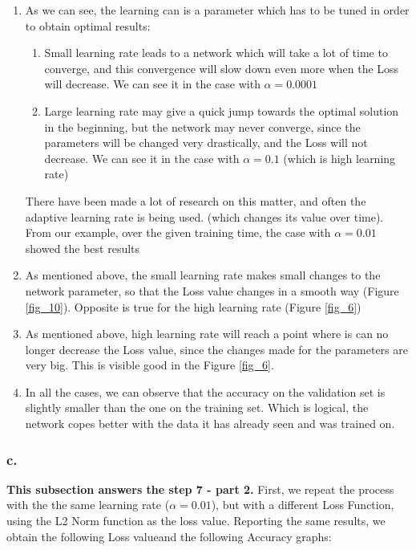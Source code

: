 \documentclass[a4paper]{iacas}
\begin{document}
\begin{enumerate}
\item As we can see, the learning can is a parameter which has to be tuned in order to obtain optimal results:
\begin{enumerate}
\item Small learning rate leads to a network which will take a lot of time to converge, and this convergence will slow down even more when the Loss will decrease. We can see it in the case with $\alpha=0.0001$
\item Large learning rate may give a quick jump towards the optimal solution in the beginning, but the network may never converge, since the parameters will be changed very drastically, and the Loss will not decrease. We can see it in the case with $\alpha=0.1$ (which is high learning rate)
\end{enumerate}
There have been made a lot of research on this matter, and often the adaptive learning rate is being used. (which changes its value over time). From our example, over the given training time, the case with $\alpha = 0.01$ showed the best results
\item As mentioned above, the small learning rate makes small changes to the network parameter, so that the Loss value changes in a smooth way (Figure \ref{fig_10}). Opposite is true for the high learning rate (Figure \ref{fig_6})
\item As mentioned above, high learning rate will reach a point where is can no longer decrease the Loss value, since the changes made for the parameters are very big. This is visible good in the Figure \ref{fig_6}.
\item In all the cases, we can observe that the accuracy on the validation set is slightly smaller than the one on the training set. Which is logical, the network copes better with the data it has already seen and was trained on.

\end{enumerate}






\newpage
\subsubsection{\textbf{c.}}
\textbf{This subsection answers the step 7 - part 2. }
\newline
First, we repeat the process with the the same learning rate ($\alpha = 0.01$), but with a different Loss Function, using the L2 Norm function as the loss value. Reporting the same results, we obtain the following Loss valueand the following Accuracy graphs:
\end{document}
